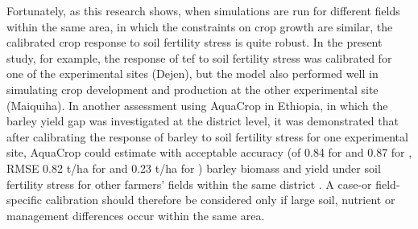 Fortunately, as this research shows, when simulations are run for different fields within the same area, in which the constraints on crop growth are similar, the calibrated crop response to soil fertility stress is quite robust. In the present study, for example, the response of tef to soil fertility stress was calibrated for one of the experimental sites (Dejen), but the model also performed well in simulating crop development and production at the other experimental site (Maiquiha). In another assessment using AquaCrop in Ethiopia, in which the barley yield gap was investigated at the district level, it was demonstrated that after calibrating the response of barley to soil fertility stress for one experimental site, AquaCrop could estimate with acceptable accuracy (\Rsq of 0.84 for \B and 0.87 for \Y, RMSE 0.82 \si{t/ha} for \B and 0.23 \si{t/ha} for \Y) barley biomass and yield under soil fertility stress for other farmers' fields within the same district \parencite{abrha2013}. A case-or field-specific calibration should therefore be considered only if large soil, nutrient or management differences occur within the same area. 

